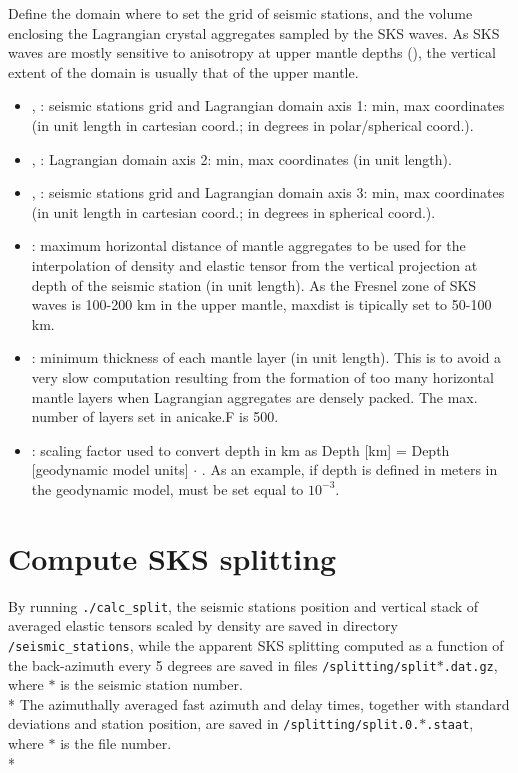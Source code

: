 Define the domain where to set the grid of seismic stations, and the volume enclosing the Lagrangian crystal aggregates sampled by the SKS waves. As SKS waves are mostly sensitive to anisotropy at upper mantle depths (\citet{sieminski2008bssa}), the vertical extent of the domain is usually that of the upper mantle.
\begin{itemize}
    \item {}, : seismic stations grid and Lagrangian domain axis 1: min, max coordinates (in unit length in cartesian coord.; in degrees in polar/spherical coord.).  
    \item {}, : Lagrangian domain axis 2: min, max coordinates (in unit length).  
    \item {}, : seismic stations grid and Lagrangian domain axis 3: min, max coordinates (in unit length in cartesian coord.; in degrees in spherical coord.).
    \item {}: maximum horizontal distance of mantle aggregates to be used for the interpolation of density and elastic tensor from the vertical projection at depth of the seismic station (in unit length). As the Fresnel zone of SKS waves is 100-200 km in the upper mantle, maxdist is tipically set to 50-100 km.
    \item {}: minimum thickness of each mantle layer (in unit length). This is to avoid a very slow computation resulting from the formation of too many horizontal mantle layers when Lagrangian aggregates are densely packed. The max. number of layers set in anicake.F is 500. 
    \item {}: scaling factor used to convert depth in km as Depth [km] = Depth [geodynamic model units] $\cdot$ . As an example, if depth is defined in meters in the geodynamic model,  must be set equal to $10^{-3}$.  
\end{itemize}

\section{Compute SKS splitting}
By running \texttt{./calc\_split}, the seismic stations position and vertical stack of averaged elastic tensors scaled by density are saved in directory \texttt{/seismic\_stations}, while the apparent SKS splitting computed as a function of the back-azimuth every 5 degrees are saved in files \texttt{/splitting/split$*$.dat.gz}, where $*$ is the seismic station number. \\*
The azimuthally averaged fast azimuth and delay times, together with standard deviations and station position, are saved in \texttt{/splitting/split.0.$*$.staat}, where $*$ is the \cijkltitle{} file number.\\*

